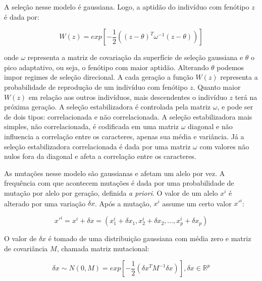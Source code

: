 A seleção nesse modelo é gaussiana.
Logo, a aptidão do indivíduo com fenótipo $z$ é dada por:

\begin{equation}
W(z) = exp \left[-\frac{1}{2} ((z-\theta)^T \omega^{-1} (z-\theta))\right] 
\label{selecao}
\end{equation}

onde $\omega$ representa a matriz de covariação da superfície de seleção
gaussiana e $\theta$ o pico adaptativo, ou seja, o fenótipo com maior
aptidão.
Alterando $\theta$ podemos impor regimes de seleção direcional.
A cada geração a função $W(z)$ representa a probabilidade de reprodução
de um indivíduo com fenótipo $z$.
Quanto maior $W(z)$ em relação aos outros indivíduos, mais descendentes
o indivíduo $z$ terá na próxima geração.
A seleção estabilizadora é controlada pela matriz $\omega$, e
pode ser de dois tipos: correlacionada e não correlacionada.
A seleção estabilizadora mais simples, não correlacionada, é codificada
em uma matriz $\omega$ diagonal e não influencia a correlação entre os
caracteres, apenas sua média e variância.
Já a seleção estabilizadora correlacionada é dada por uma matriz
$\omega$ com valores não nulos fora da diagonal e afeta a correlação
entre os caracteres.

As mutações nesse modelo são gaussianas e afetam um alelo por vez.
A frequência com que acontecem mutações é dada por uma probabilidade de
mutação por alelo por geração, definida {\it a priori}.
O valor de um alelo $x^i$ é alterado por uma variação $ \delta x$.
Após a mutação, $x^i$ assume um certo valor $x'^i$:

\begin{equation}
x'^i = x^i + \delta x = ( x^i_1 + \delta x_1, x^i_2 + \delta x_2,\ldots, x^i_p + \delta x_p)
\end{equation}

O valor de $\delta x$ é tomado de uma distribuição gaussiana com média
zero e matriz de covariância $M$, chamada matriz mutacional:

\begin{equation}
\delta x \sim N(0, M) = exp \left[-\frac{1}{2} (\delta x^T M^{-1} \delta x)\right] , \delta x \in \mathbb{R}^p
\end{equation}

